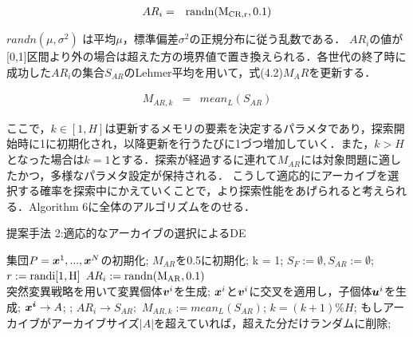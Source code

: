 \documentclass[a4paper,11pt,oneside,openany]{jsbook}
\def\vector#1{\mbox{\boldmath $#1$}}
\begin{document}
\begin{eqnarray}
  AR_i & = & \rm{randn}(M_{CR,r}, 0.1)
\end{eqnarray}

$randn(\mu,\sigma^2)$ は平均$\mu$，標準偏差$\sigma^2$の正規分布に従う乱数である．
$AR_i$の値が[0,1]区間より外の場合は超えた方の境界値で置き換えられる．各世代の終了時に成功した$AR_i$の集合$S_{AR}$のLehmer平均を用いて，式(4.2)$M_AR$を更新する．

\begin{eqnarray}
  M_{AR,k} & = & mean_L(S_{AR})
\end{eqnarray}

ここで，$k \in [1,H]$は更新するメモリの要素を決定するパラメタであり，探索開始時に1に初期化され，以降更新を行うたびに1づつ増加していく．また，$k > H$となった場合は$k = 1$とする．探索が経過するに連れて$M_{AR}$には対象問題に適したかつ，多様なパラメタ設定が保持される．
こうして適応的にアーカイブを選択する確率を探索中にかえていくことで，より探索性能をあげられると考えられる．Algorithm 6に全体のアルゴリズムをのせる．

\begin{algorithm}
\caption{提案手法 2:適応的なアーカイブの選択によるDE}
\label{alg:pbnf}
\begin{algorithmic}
\STATE 集団$P={\vector{x}^1,...,\vector{x}^N}$の初期化;
\STATE $M _{AR}$を0.5に初期化;
\STATE k = 1;
    \STATE $S_F := \emptyset, S_{AR} := \emptyset$;
        \STATE $r := \rm{randi}[1,H]$
        \STATE $AR_i := \rm{randn}(M_{AR}, 0.1)$ \\
        \STATE 突然変異戦略を用いて変異個体{$\vector{v}^i$}を生成;
        \STATE $\vector{x}^i$と$\vector{v}^i$に交叉を適用し，子個体$\vector{u}^i$を生成;
     \ENDFOR
        \IF {$f(\vector{u}^i) \leqq f(\vector{x}^i)$}
            \STATE $\vector{x^i} \rightarrow {A}$;
            \STATE {$\vector{x}^i=\vector{u}^i$};
            \STATE $AR_i \rightarrow S_{AR};$
        \ENDIF
    \ENDFOR
        \STATE $M_{AR,k}  :=  mean_L(S_{AR})$;
        \STATE $k = (k+1) \% H$;
    \ENDIF
    \STATE もしアーカイブがアーカイブサイズ$|A|$を超えていれば，超えた分だけランダムに削除;
\ENDWHILE
\end{algorithmic}
\end{algorithm}
\end{document}
